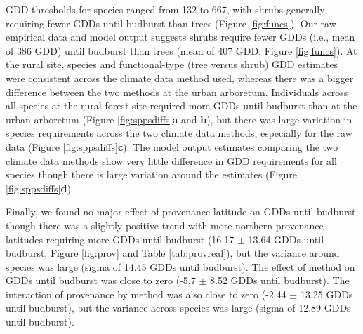 \documentclass{article}\usepackage[]{graphicx}\usepackage[]{color}
\begin{document}
GDD thresholds for species ranged from 132 to 667, with shrubs generally requiring fewer GDDs until budburst than trees (Figure \ref{fig:funcs}). Our raw empirical data and model output suggests shrubs require fewer GDDs (i.e., mean of 386 GDD) until budburst than trees (mean of 407 GDD; Figure \ref{fig:funcs}). At the rural site, species and functional-type (tree versus shrub) GDD estimates were consistent across the climate data method used, whereas there was a bigger difference between the two methods at the urban arboretum. Individuals across all species at the rural forest site required more GDDs until budburst than at the urban arboretum (Figure \ref{fig:sppsdiffs}\textbf{a} and \textbf{b}), but there was large variation in species requirements across the two climate data methods, especially for the raw data (Figure \ref{fig:sppsdiffs}\textbf{c}). The model output estimates comparing the two climate data methods show very little difference in GDD requirements for all species though there is large variation around the estimates (Figure \ref{fig:sppsdiffs}\textbf{d}). 

Finally, we found no major effect of provenance latitude on GDDs until budburst though there was a slightly positive trend with more northern provenance latitudes requiring more GDDs until budburst (16.17 $\pm$ 13.64 GDDs until budburst; Figure \ref{fig:prov} and Table \ref{tab:provreal}), but the variance around species was large (sigma of 14.45 GDDs until budburst). The effect of method on GDDs until budburst was close to zero (-5.7 $\pm$ 8.52 GDDs until budburst). The interaction of provenance by method was also close to zero (-2.44 $\pm$ 13.25 GDDs until budburst), but the variance across species was large (sigma of 12.89 GDDs until budburst).
\end{document}
